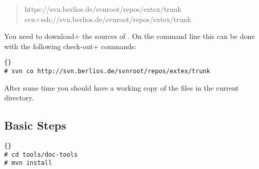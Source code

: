 \begin{quotation}
  https://svn.berlios.de/svnroot/repos/extex/trunk
  svn+ssh://svn.berlios.de/svnroot/repos/extex/trunk
\end{quotation}

You need to \+download+ the sources of \ExTeX. On the command line
this can be done with the following \+check-out+ commands:

\begin{lstlisting}{}
# svn co http://svn.berlios.de/svnroot/repos/extex/trunk
\end{lstlisting}

After some time you should have a working copy of the files in the
current directory.

\subsection{Basic Steps}


\begin{lstlisting}{}
# cd tools/doc-tools
# mvn install
\end{lstlisting}



%
%
%

